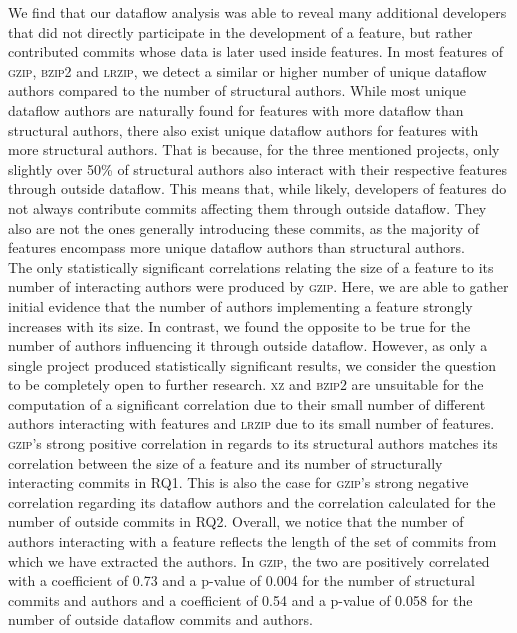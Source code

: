 We find that our dataflow analysis was able to reveal many additional developers that did not directly participate in the development of a feature, but rather contributed commits whose data is later used inside features.
In most features of \textsc{gzip}, \textsc{bzip2} and \textsc{lrzip}, we detect a similar or higher number of unique dataflow authors compared to the number of structural authors.
While most unique dataflow authors are naturally found for features with more dataflow than structural authors, there also exist unique dataflow authors for features with more structural authors.
That is because, for the three mentioned projects, only slightly over 50\% of structural authors also interact with their respective features through outside dataflow.
This means that, while likely, developers of features do not always contribute commits affecting them through outside dataflow.
They also are not the ones generally introducing these commits, as the majority of features encompass more unique dataflow authors than structural authors. \\
The only statistically significant correlations relating the size of a feature to its number of interacting authors were produced by \textsc{gzip}.
Here, we are able to gather initial evidence that the number of authors implementing a feature strongly increases with its size.  
In contrast, we found the opposite to be true for the number of authors influencing it through outside dataflow. 
However, as only a single project produced statistically significant results, we consider the question to be completely open to further research. 
\textsc{xz} and \textsc{bzip2} are unsuitable for the computation of a significant correlation due to their small number of different authors interacting with features and \textsc{lrzip} due to its small number of features. \\
\textsc{gzip}'s strong positive correlation in regards to its structural authors matches its correlation between the size of a feature and its number of structurally interacting commits in RQ1.
This is also the case for \textsc{gzip}'s strong negative correlation regarding its dataflow authors and the correlation calculated for the number of outside commits in RQ2.
Overall, we notice that the number of authors interacting with a feature reflects the length of the set of commits from which we have extracted the authors.
In \textsc{gzip}, the two are positively correlated with a coefficient of 0.73 and a p-value of 0.004 for the number of structural commits and authors and a coefficient of 0.54 and a p-value of 0.058 for the number of outside dataflow commits and authors.
